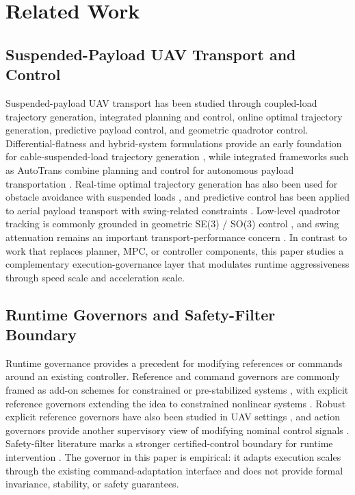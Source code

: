\section{Related Work}

\subsection{Suspended-Payload UAV Transport and Control}

Suspended-payload UAV transport has been studied through coupled-load
trajectory generation, integrated planning and control, online optimal
trajectory generation, predictive payload control, and geometric quadrotor
control. Differential-flatness and hybrid-system formulations provide an early
foundation for cable-suspended-load trajectory generation
\cite{Sreenath2013DifferentiallyFlatHybrid}, while integrated frameworks such
as AutoTrans combine planning and control for autonomous payload transportation
\cite{Li2023AutoTrans}. Real-time optimal trajectory generation has also been
used for obstacle avoidance with suspended loads
\cite{Son2020ObstacleAvoidanceSuspendedLoad}, and predictive control has been
applied to aerial payload transport with swing-related constraints
\cite{UrbinaBrito2021PredictivePayloadTransport}. Low-level quadrotor tracking
is commonly grounded in geometric SE(3) / SO(3) control
\cite{Lee2010GeometricTrackingSE3}, and swing attenuation remains an important
transport-performance concern \cite{GuerreroSanchez2017SwingAttenuation}. In
contrast to work that replaces planner, MPC, or controller components, this
paper studies a complementary execution-governance layer that modulates
runtime aggressiveness through speed scale and acceleration scale.


\subsection{Runtime Governors and Safety-Filter Boundary}

Runtime governance provides a precedent for modifying references or commands
around an existing controller. Reference and command governors are commonly
framed as add-on schemes for constrained or pre-stabilized systems
\cite{Garone2017ReferenceCommandGovernorsSurvey}, with explicit reference
governors extending the idea to constrained nonlinear systems
\cite{Garone2016ExplicitReferenceGovernor}. Robust explicit reference
governors have also been studied in UAV settings
\cite{Nicotra2016UAVRobustERG}, and action governors provide another
supervisory view of modifying nominal control signals
\cite{Li2021ActionGovernor}. Safety-filter literature marks a stronger
certified-control boundary for runtime intervention
\cite{Hsu2024SafetyFilterUnifiedView}. The governor in this paper is empirical:
it adapts execution scales through the existing command-adaptation interface
and does not provide formal invariance, stability, or safety guarantees.

